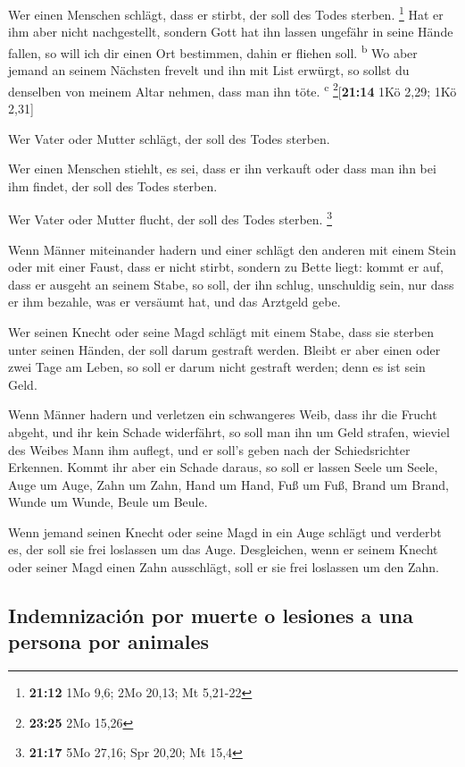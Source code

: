  Wer einen Menschen schlägt, dass er stirbt, der soll des
Todes sterben. \footnote{\textbf{21:12} 1Mo 9,6; 2Mo 20,13; Mt 5,21-22}
 Hat er ihm aber nicht nachgestellt, sondern Gott hat ihn
lassen ungefähr in seine Hände fallen, so will ich dir einen Ort
bestimmen, dahin er fliehen soll. \textsuperscript{b}  Wo
aber jemand an seinem Nächsten frevelt und ihn mit List erwürgt, so
sollst du denselben von meinem Altar nehmen, dass man ihn töte.
\textsuperscript{c} \footnote{\textbf{23:25} 2Mo 15,26}{[}\textbf{21:14}
1Kö 2,29; 1Kö 2,31{]}

 Wer Vater oder Mutter schlägt, der soll des Todes
sterben.

 Wer einen Menschen stiehlt, es sei, dass er ihn verkauft
oder dass man ihn bei ihm findet, der soll des Todes sterben.

 Wer Vater oder Mutter flucht, der soll des Todes
sterben. \footnote{\textbf{21:17} 5Mo 27,16; Spr 20,20; Mt 15,4}

 Wenn Männer miteinander hadern und einer schlägt den
anderen mit einem Stein oder mit einer Faust, dass er nicht stirbt,
sondern zu Bette liegt:  kommt er auf, dass er ausgeht an
seinem Stabe, so soll, der ihn schlug, unschuldig sein, nur dass er ihm
bezahle, was er versäumt hat, und das Arztgeld gebe.

 Wer seinen Knecht oder seine Magd schlägt mit einem
Stabe, dass sie sterben unter seinen Händen, der soll darum gestraft
werden.  Bleibt er aber einen oder zwei Tage am Leben, so
soll er darum nicht gestraft werden; denn es ist sein Geld.

 Wenn Männer hadern und verletzen ein schwangeres Weib,
dass ihr die Frucht abgeht, und ihr kein Schade widerfährt, so soll man
ihn um Geld strafen, wieviel des Weibes Mann ihm auflegt, und er soll's
geben nach der Schiedsrichter Erkennen.  Kommt ihr aber
ein Schade daraus, so soll er lassen Seele um Seele, 
Auge um Auge, Zahn um Zahn, Hand um Hand, Fuß um Fuß, 
Brand um Brand, Wunde um Wunde, Beule um Beule.

 Wenn jemand seinen Knecht oder seine Magd in ein Auge
schlägt und verderbt es, der soll sie frei loslassen um das Auge.
 Desgleichen, wenn er seinem Knecht oder seiner Magd
einen Zahn ausschlägt, soll er sie frei loslassen um den Zahn.

\hypertarget{indemnizaciuxf3n-por-muerte-o-lesiones-a-una-persona-por-animales}{%
\subsection{Indemnización por muerte o lesiones a una persona por
animales}\label{indemnizaciuxf3n-por-muerte-o-lesiones-a-una-persona-por-animales}}

